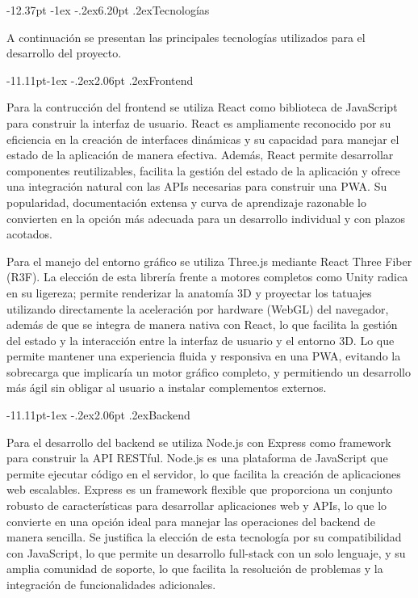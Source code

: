 \documentclass[12pt,letterpaper,oneside]{report}
\makeatletter
\renewcommand\section{\@startsection{section}{1}{\z@}%
  {-12.37pt \@plus -1ex \@minus -.2ex}{6.20pt \@plus.2ex}{\normalfont\large\bfseries}}
\renewcommand\subsection{\@startsection{subsection}{2}{\z@}%
  {-11.11pt\@plus -1ex \@minus -.2ex}{2.06pt \@plus .2ex}{\normalfont\normalsize\bfseries}}
\makeatother
\begin{document}
\section{Tecnologías }

A continuación se presentan las principales tecnologías utilizados para el desarrollo del proyecto.

\subsection{Frontend}

Para la contrucción del frontend se utiliza React\cite{react} como biblioteca de JavaScript\cite{javascript} para construir la interfaz de usuario. React es ampliamente reconocido por su eficiencia en la creación de interfaces dinámicas y su capacidad para manejar el estado de la aplicación de manera efectiva. Además, React permite desarrollar componentes reutilizables, facilita la gestión del estado de la aplicación y ofrece una integración natural con las APIs necesarias para construir una PWA. Su popularidad, documentación extensa y curva de aprendizaje razonable lo convierten en la opción más adecuada para un desarrollo individual y con plazos acotados.

Para el manejo del entorno gráfico se utiliza Three.js\cite{threejs} mediante React Three Fiber (R3F)\cite{r3f}. La elección de esta librería frente a motores completos como Unity\cite{unity} radica en su ligereza; permite renderizar la anatomía 3D y proyectar los tatuajes utilizando directamente la aceleración por hardware (WebGL)\cite{webgl} del navegador, además de que se integra de manera nativa con React, lo que facilita la gestión del estado y la interacción entre la interfaz de usuario y el entorno 3D. Lo que permite mantener una experiencia fluida y responsiva en una PWA, evitando la sobrecarga que implicaría un motor gráfico completo, y permitiendo un desarrollo más ágil sin obligar al usuario a instalar complementos externos.

\subsection{Backend}

Para el desarrollo del backend se utiliza Node.js \cite{nodejs} con Express \cite{express} como framework para construir la API RESTful\cite{fielding2000}. Node.js es una plataforma de JavaScript que permite ejecutar código en el servidor, lo que facilita la creación de aplicaciones web escalables. Express es un framework flexible que proporciona un conjunto robusto de características para desarrollar aplicaciones web y APIs, lo que lo convierte en una opción ideal para manejar las operaciones del backend de manera sencilla. Se justifica la elección de esta tecnología por su compatibilidad con JavaScript, lo que permite un desarrollo full-stack con un solo lenguaje, y su amplia comunidad de soporte, lo que facilita la resolución de problemas y la integración de funcionalidades adicionales.
\end{document}

